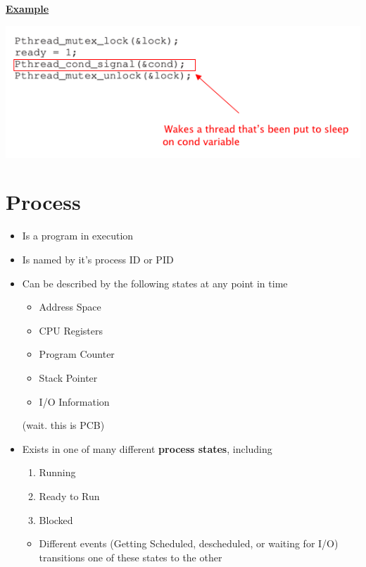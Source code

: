 \documentclass[12pt]{article}
\begin{document}
\begin{itemize}
    \bigskip

    \underline{\textbf{Example}}

    \begin{center}
    \includegraphics[width=0.8\linewidth]{images/midterm_2_solution_10.png}
    \end{center}

\end{itemize}

\section{Process}

\begin{itemize}
    \item Is a program in execution
    \item Is named by it's process ID or PID
    \item Can be described by the following states at any point in time

    \begin{itemize}
        \item Address Space
        \item CPU Registers
        \item Program Counter
        \item Stack Pointer
        \item I/O Information
    \end{itemize}

    (wait. this is PCB)

    \item Exists in one of many different \textbf{process states}, including

    \begin{enumerate}[1.]
        \item Running
        \item Ready to Run
        \item Blocked
    \end{enumerate}

    \bigskip

    \begin{itemize}
        \item Different events (Getting Scheduled, descheduled, or waiting for I/O)
        transitions one of these states to the other
    \end{itemize}

\end{itemize}
\end{document}
